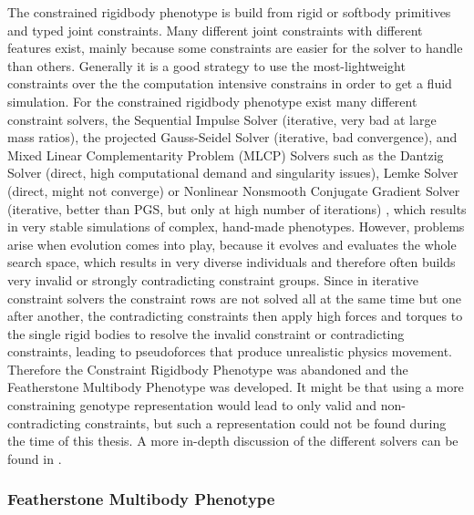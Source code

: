 \documentclass[main]{subfiles}
\begin{document}
The constrained rigidbody phenotype is build from rigid or softbody primitives and typed joint constraints. Many different joint constraints with different features exist, mainly because some constraints are easier for the solver to handle than others. Generally it is a good strategy to use the most-lightweight constraints over the the computation intensive constrains in order to get a fluid simulation. For the constrained rigidbody phenotype exist many different constraint solvers, the Sequential Impulse Solver (iterative, very bad at large mass ratios), the projected Gauss-Seidel Solver (iterative, bad convergence), and Mixed Linear Complementarity Problem (MLCP) Solvers such as the Dantzig Solver (direct, high computational demand and singularity issues), Lemke Solver (direct, might not converge) or Nonlinear Nonsmooth Conjugate Gradient Solver (iterative, better than PGS, but only at high number of iterations) \cite{bib::Coumans2014}, which results in very stable simulations of complex, hand-made phenotypes. However, problems arise when evolution comes into play, because it evolves and evaluates the whole search space, which results in very diverse individuals and therefore often builds very invalid or strongly contradicting constraint groups. Since in iterative constraint solvers the constraint rows are not solved all at the same time but one after another, the contradicting constraints then apply high forces and torques to the single rigid bodies to resolve the invalid constraint or contradicting constraints, leading to pseudoforces that produce unrealistic physics movement. Therefore the Constraint Rigidbody Phenotype was abandoned and the Featherstone Multibody Phenotype was developed. It might be that using a more constraining genotype representation would lead to only valid and non-contradicting constraints, but such a representation could not be found during the time of this thesis. A more in-depth discussion of the different solvers can be found in \cite{bib::Coumans2014}.

\subsubsection{Featherstone Multibody Phenotype}
\end{document}
